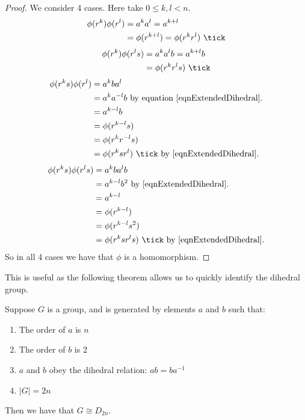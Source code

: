 \documentclass[../Main.tex]{subfiles}
\begin{document}
\begin{proof}
    We consider 4 cases. Here take $0 \leq k, l < n$.
    \begin{align*}
        \phi(r^k) \phi(r^l) &= a^k a^l = a^{k + l} \\
        &= \phi(r^{k + l}) = \phi(r^k r^l)~\tick
    \end{align*}
    \begin{align*}
        \phi(r^k)\phi(r^l s) &= a^k a^l b = a^{k + l} b \\
        &= \phi(r^k r^l s)~\tick
    \end{align*}
    \begin{align*}
        \phi(r^k s) \phi(r^l) &= a^k b a^l \\
        &= a^k a^{-l} b \text{ by equation~\ref{eqnExtendedDihedral}.} \\
        &= a^{k-l} b \\
        &= \phi(r^{k-l} s) \\
        &= \phi(r^k r^{-l} s) \\
        &= \phi(r^k s r^l)~\tick \text{ by~\ref{eqnExtendedDihedral}.}
    \end{align*}
    \begin{align*}
        \phi(r^k s) \phi(r^l s) &= a^k b a^l b \\
        &= a^{k-l} b^2 \text{ by~\ref{eqnExtendedDihedral}.} \\
        &= a^{k-l} \\
        &= \phi(r^{k-l}) \\
        &= \phi(r^{k-l} s^2) \\
        &= \phi(r^k s r^l s)~\tick \text{ by~\ref{eqnExtendedDihedral}.}
    \end{align*}
    So in all 4 cases we have that $\phi$ is a homomorphism.
\end{proof}
This is useful as the following theorem allows us to quickly identify the dihedral group.
\begin{theorem}
    Suppose $G$ is a group, and is generated by elements $a$ and $b$ such that:
    \begin{enumerate}
        \item The order of $a$ is $n$
        \item The order of $b$ is 2
        \item $a$ and $b$ obey the dihedral relation: $ab = ba^{-1}$
        \item $|G| = 2n$
    \end{enumerate}
    Then we have that $G \cong D_{2n}$.
    \label{thmD2nIsomorphism}
\end{theorem}
\end{document}
